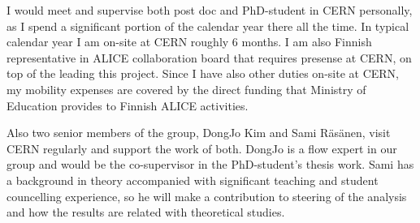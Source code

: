 I would meet and supervise both post doc and PhD-student in CERN personally, as I spend a significant portion of the calendar year there all the time. In typical calendar year I am on-site at CERN roughly 6 months. I am also Finnish representative in ALICE collaboration board that requires presense at CERN, on top of the leading this project. Since I have also other duties on-site at CERN, my mobility expenses are covered by the direct funding that Ministry of Education provides to Finnish ALICE activities.

Also two senior members of the group, DongJo Kim and Sami R\"as\"anen, visit CERN regularly and support the work of both. DongJo is a flow expert in our group and would be the co-supervisor in the PhD-student's thesis work. Sami has a background in theory accompanied with significant teaching and student councelling experience, so he will make a contribution to steering of the analysis and how the results are related with theoretical studies.


\nopagebreak
